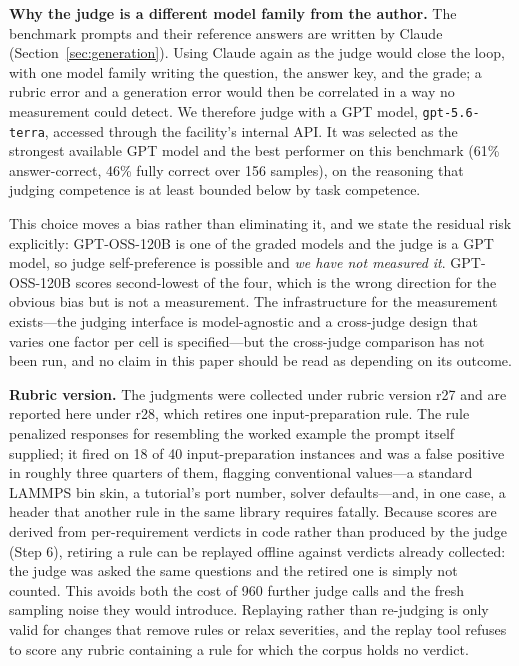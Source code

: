 \documentclass[conference]{IEEEtran}
\begin{document}
\textbf{Why the judge is a different model family from the author.} The benchmark prompts and their reference answers are written by Claude (Section~\ref{sec:generation}). Using Claude again as the judge would close the loop, with one model family writing the question, the answer key, and the grade; a rubric error and a generation error would then be correlated in a way no measurement could detect. We therefore judge with a GPT model, \texttt{gpt-5.6-terra}, accessed through the facility's internal API. It was selected as the strongest available GPT model and the best performer on this benchmark (61\% answer-correct, 46\% fully correct over 156 samples), on the reasoning that judging competence is at least bounded below by task competence.

This choice moves a bias rather than eliminating it, and we state the residual risk explicitly: GPT-OSS-120B is one of the graded models and the judge is a GPT model, so judge self-preference is possible and \emph{we have not measured it}. GPT-OSS-120B scores second-lowest of the four, which is the wrong direction for the obvious bias but is not a measurement. The infrastructure for the measurement exists---the judging interface is model-agnostic and a cross-judge design that varies one factor per cell is specified---but the cross-judge comparison has not been run, and no claim in this paper should be read as depending on its outcome.

\textbf{Rubric version.} The judgments were collected under rubric version r27 and are reported here under r28, which retires one input-preparation rule. The rule penalized responses for resembling the worked example the prompt itself supplied; it fired on 18 of 40 input-preparation instances and was a false positive in roughly three quarters of them, flagging conventional values---a standard LAMMPS bin skin, a tutorial's port number, solver defaults---and, in one case, a header that another rule in the same library requires fatally. Because scores are derived from per-requirement verdicts in code rather than produced by the judge (Step 6), retiring a rule can be replayed offline against verdicts already collected: the judge was asked the same questions and the retired one is simply not counted. This avoids both the cost of 960 further judge calls and the fresh sampling noise they would introduce. Replaying rather than re-judging is only valid for changes that remove rules or relax severities, and the replay tool refuses to score any rubric containing a rule for which the corpus holds no verdict.
\end{document}
